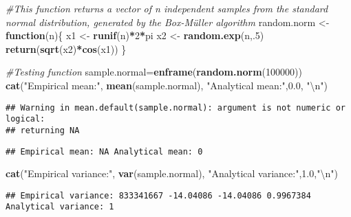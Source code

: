 \documentclass[]{article}
\newenvironment{Shaded}{\begin{snugshade}}{\end{snugshade}}
\newcommand{\CharTok}[1]{\textcolor[rgb]{0.31,0.60,0.02}{#1}}
\newcommand{\CommentTok}[1]{\textcolor[rgb]{0.56,0.35,0.01}{\textit{#1}}}
\newcommand{\ControlFlowTok}[1]{\textcolor[rgb]{0.13,0.29,0.53}{\textbf{#1}}}
\newcommand{\DecValTok}[1]{\textcolor[rgb]{0.00,0.00,0.81}{#1}}
\newcommand{\FloatTok}[1]{\textcolor[rgb]{0.00,0.00,0.81}{#1}}
\newcommand{\KeywordTok}[1]{\textcolor[rgb]{0.13,0.29,0.53}{\textbf{#1}}}
\newcommand{\NormalTok}[1]{#1}
\newcommand{\OperatorTok}[1]{\textcolor[rgb]{0.81,0.36,0.00}{\textbf{#1}}}
\newcommand{\StringTok}[1]{\textcolor[rgb]{0.31,0.60,0.02}{#1}}
\begin{document}
\begin{Shaded}
\begin{Highlighting}[]
\CommentTok{#This function returns a vector of n independent samples from the standard normal distribution, generated by the Box-Müller algorithm}
\NormalTok{random.norm <-}\StringTok{ }\ControlFlowTok{function}\NormalTok{(n)\{}
\NormalTok{  x1 <-}\StringTok{ }\KeywordTok{runif}\NormalTok{(n)}\OperatorTok{*}\DecValTok{2}\OperatorTok{*}\NormalTok{pi}
\NormalTok{  x2 <-}\StringTok{ }\KeywordTok{random.exp}\NormalTok{(n,.}\DecValTok{5}\NormalTok{)}
  \KeywordTok{return}\NormalTok{(}\KeywordTok{sqrt}\NormalTok{(x2)}\OperatorTok{*}\KeywordTok{cos}\NormalTok{(x1))}
\NormalTok{\}}

\CommentTok{#Testing function}
\NormalTok{sample.normal=}\KeywordTok{enframe}\NormalTok{(}\KeywordTok{random.norm}\NormalTok{(}\DecValTok{100000}\NormalTok{))}
\KeywordTok{cat}\NormalTok{(}\StringTok{"Empirical mean:"}\NormalTok{, }\KeywordTok{mean}\NormalTok{(sample.normal), }\StringTok{"Analytical mean:"}\NormalTok{,}\FloatTok{0.0}\NormalTok{, }\StringTok{"}\CharTok{\textbackslash{}n}\StringTok{"}\NormalTok{)}
\end{Highlighting}
\end{Shaded}

\begin{verbatim}
## Warning in mean.default(sample.normal): argument is not numeric or logical:
## returning NA
\end{verbatim}

\begin{verbatim}
## Empirical mean: NA Analytical mean: 0
\end{verbatim}

\begin{Shaded}
\begin{Highlighting}[]
\KeywordTok{cat}\NormalTok{(}\StringTok{"Empirical variance:"}\NormalTok{, }\KeywordTok{var}\NormalTok{(sample.normal), }\StringTok{"Analytical variance:"}\NormalTok{,}\FloatTok{1.0}\NormalTok{,}\StringTok{"}\CharTok{\textbackslash{}n}\StringTok{"}\NormalTok{)}
\end{Highlighting}
\end{Shaded}

\begin{verbatim}
## Empirical variance: 833341667 -14.04086 -14.04086 0.9967384 Analytical variance: 1
\end{verbatim}
\end{document}
